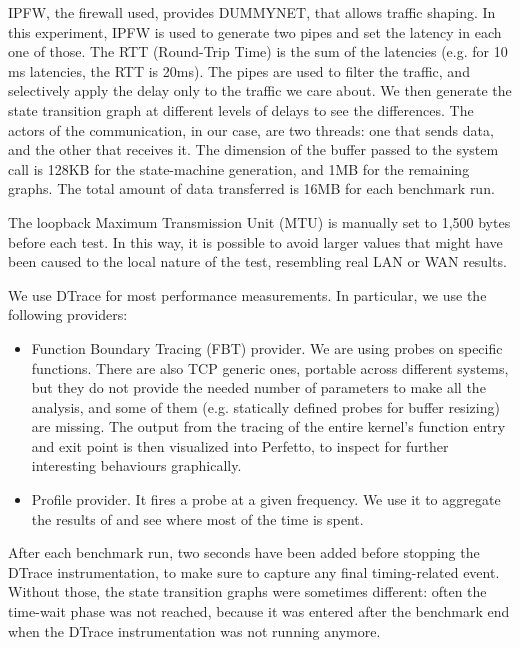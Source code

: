 \documentclass[a4paper,10pt]{article}
\begin{document}
IPFW, the firewall used, provides DUMMYNET\cite{luigirizzo_luigirizzodummynet_2020}, that allows traffic shaping. In this experiment, IPFW is used to generate two pipes and set the latency in each one of those. The RTT (Round-Trip Time) is the sum of the latencies (e.g. for 10 ms latencies, the RTT is 20ms). The pipes are used to filter the traffic, and selectively apply the delay only to the traffic we care about. We then generate the state transition graph at different levels of delays to see the differences.
The actors of the communication, in our case, are two threads: one that sends data, and the other that receives it. The dimension of the buffer passed to the  system call is 128KB for the state-machine generation, and 1MB for the remaining graphs.
The total amount of data transferred is 16MB for each benchmark run.

The loopback Maximum Transmission Unit (MTU) is manually set to 1,500 bytes before each test. In this way, it is possible to avoid larger values that might have been caused to the local nature of the test, resembling real LAN or WAN results.

We use DTrace for most performance measurements. In particular, we use the following providers:

\begin{itemize}
   \item Function Boundary Tracing (FBT) provider. We are using probes on specific functions. There are also TCP generic ones, portable across different systems, but they do not provide the needed number of parameters to make all the analysis, and some of them (e.g. statically defined probes for buffer resizing) are missing. The output from the tracing of the entire kernel's function entry and exit point is then visualized into Perfetto\cite{noauthor_perfetto_nodate}, to inspect for further interesting behaviours graphically.
   \item Profile provider. It fires a probe at a given frequency. We use it to aggregate the results of  and see where most of the time is spent. 
\end{itemize}

After each benchmark run, two seconds have been added before stopping the DTrace instrumentation, to make sure to capture any final timing-related event. Without those, the state transition graphs were sometimes different: often the time-wait phase was not reached, because it was entered after the benchmark end when the DTrace instrumentation was not running anymore.
\end{document}

